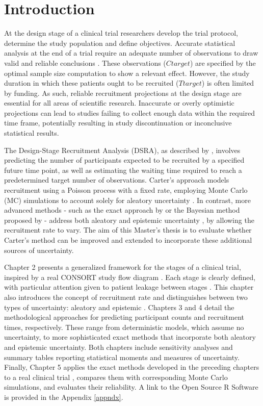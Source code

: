 


\chapter{Introduction}

At the design stage of a clinical trial researchers develop the trial protocol, determine the study population and define objectives. Accurate statistical analysis at the end of a trial require an adequate number of observations to draw valid and reliable conclusions \citep{panos2023statistical}. These observations ($Ctarget$) are specified by the optimal sample size computation to show a relevant effect. However, the study duration in which these patients ought to be recruited ($Ttarget$) is often limited by funding. As such, reliable recruitment projections at the design stage are essential for all areas of scientific research. Inaccurate or overly optimistic projections can lead to studies failing to collect enough data within the required time frame, potentially resulting in study discontinuation or inconclusive statistical results.

The Design-Stage Recruitment Analysis (DSRA), as described by \cite{carter2004application}, involves predicting the number of participants expected to be recruited by a specified future time point, as well as estimating the waiting time required to reach a predetermined target number of observations. Carter's approach models recruitment using a Poisson process with a fixed rate, employing Monte Carlo (MC) simulations to account solely for aleatory uncertainty \citep{ohagan2006}. In contrast, more advanced methods - such as the exact approach by \cite{anisimov2007modelling} or the Bayesian method proposed by \cite{bagiella2001predicting} - address both aleatory and epistemic uncertainty \citep{ohagan2006}, by allowing the recruitment rate to vary. The aim of this Master's thesis is to evaluate whether Carter's method can be improved and extended to incorporate these additional sources of uncertainty.

Chapter 2 presents a generalized framework for the stages of a clinical trial, inspired by a real CONSORT study flow diagram \citep{schulz2010consort}. Each stage is clearly defined, with particular attention given to patient leakage between stages \citep{desai2014preventing}. This chapter also introduces the concept of recruitment rate and distinguishes between two types of uncertainty: aleatory and epistemic \citep{ohagan2006}. Chapters 3 and 4 detail the methodological approaches for predicting participant counts and recruitment times, respectively. These range from deterministic models, which assume no uncertainty, to more sophisticated exact methods that incorporate both aleatory and epistemic uncertainty. Both chapters include sensitivity analyses and summary tables reporting statistical moments and measures of uncertainty. Finally, Chapter 5 applies the exact methods developed in the preceding chapters to a real clinical trial \citep{carter2004application}, compares them with corresponding Monte Carlo simulations, and evaluates their reliability. A link to the Open Source R Software is provided in the Appendix \ref{appndx}.

